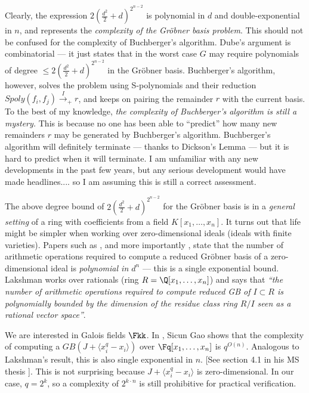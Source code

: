 Clearly, the expression $2(\frac{d^2}{2}+d)^{2^{n-2}}$ is polynomial
in $d$ and double-exponential in $n$, and represents the {\it
complexity of the Gr\"obner basis problem}. This should not be
confused for the complexity of Buchberger's algorithm. Dube's
argument is combinatorial --- it just states that in the worst case
$G$ may require polynomials of degree $\leq
2(\frac{d^2}{2}+d)^{2^{n-2}}$ in the Gr\"obner basis. Buchberger's
algorithm, however, solves the problem using S-polynomials and their
reduction $Spoly(f_i, f_j) \xrightarrow{I}_+ r$, and keeps on pairing
the remainder $r$ with the current basis. To the best of my knowledge,
{\it the complexity of Buchberger's algorithm is still a mystery.}
This is because no one has been able to ``predict'' how many new
remainders $r$ may be generated by Buchberger's
algorithm. Buchberger's algorithm will definitely terminate --- thanks
to Dickson's Lemma --- but it is hard to predict when it will
terminate. I am unfamiliar with any new developments in the past few
years, but any serious development would have made headlines.... so I
am assuming this is still a correct assessment. 

The above degree bound of $2(\frac{d^2}{2}+d)^{2^{n-2}}$ for the
Gr\"obner basis is in a {\it general setting} of a ring with
coefficients from a field $K[x_1, \dots, x_n]$. It turns out that life
might be simpler when working over zero-dimensional ideals (ideals
with finite varieties). Papers such as \cite{Lakshman:complexity_gb},
and more importantly \cite{Lakshman:complexity_gb_91}, state that the
number of arithmetic operations required to compute a reduced
Gr\"obner basis of a zero-dimensional ideal is {\it polynomial in
  $d^n$} --- this is a single exponential bound. Lakshman
\cite{Lakshman:complexity_gb_91} works over rationals (ring $R =
\Q[x_1, \dots, x_n]$) and says that {\it ``the   number of arithmetic
  operations required to compute reduced GB of $I   \subset R$ is
  polynomially bounded by the dimension of the residue   class ring
  $R/I$ seen as a rational vector space''}.  

We are interested in Galois fields $\Fkk$. In \cite{gao:gf-gb-ms},
Sicun Gao shows that the complexity of computing a $GB(J + \langle
x_i^q - x_i\rangle)$ over $\Fq[x_1, \dots, x_n]$ is $q^{O(n)}$.
Analogous to Lakshman's result, this is also single exponential in
$n$. [See  section 4.1 in his MS thesis   \cite{gao:gf-gb-ms}]. This
is not surprising because $J + \langle x_i^q - x_i \rangle$ is
zero-dimensional.  In our case,  $q = 2^k$, so a complexity of
$2^{k\cdot n}$ is still prohibitive for practical verification. 

